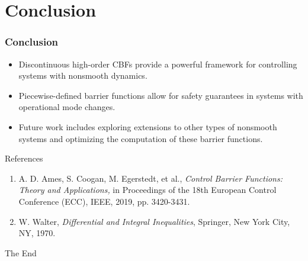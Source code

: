 \documentclass[aspectratio=169,xcolor=dvipsnames]{beamer}
\begin{document}
\section{Conclusion}
\begin{frame}
    \frametitle{Conclusion}
    \begin{itemize}
        \item Discontinuous high-order CBFs provide a powerful framework for controlling systems with nonsmooth dynamics.
        \item Piecewise-defined barrier functions allow for safety guarantees in systems with operational mode changes.
        \item Future work includes exploring extensions to other types of nonsmooth systems and optimizing the computation of these barrier functions.
    \end{itemize}
\end{frame}


\begin{frame}{References}
\begin{enumerate}
    \item A. D. Ames, S. Coogan, M. Egerstedt, et al., {\em Control Barrier Functions: Theory and Applications,} in Proceedings of the 18th European Control Conference (ECC), IEEE, 2019, pp. 3420-3431.
    \item W. Walter, {\em Differential and Integral Inequalities}, Springer, New York City, NY, 1970.
\end{enumerate}
   
\end{frame}



\begin{frame}
    \Huge{\centerline{The End}}
\end{frame}

\end{document}

